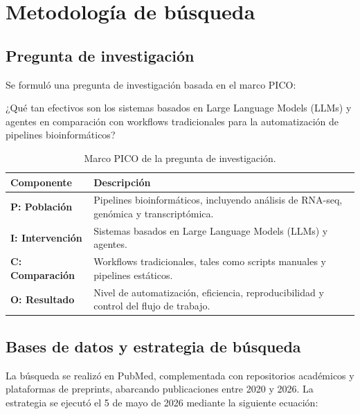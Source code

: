 
\section{Metodología de búsqueda}\label{sec:methods}

\subsection{Pregunta de investigación}

Se formuló una pregunta de investigación basada en el marco PICO:

¿Qué tan efectivos son los sistemas basados en Large Language Models (LLMs) y 
agentes en comparación con workflows tradicionales para la automatización de 
pipelines bioinformáticos?

\begin{table}[htbp]
  \centering
  \caption{Marco PICO de la pregunta de investigación.}\label{tab:pico}
  \begin{tabular}{@{}p{3.2cm} p{9.2cm}@{}}
    \toprule
    \textbf{Componente} & \textbf{Descripción} \\
    \midrule
    \textbf{P: Población}    & Pipelines bioinformáticos, incluyendo análisis de RNA-seq, genómica y transcriptómica. \\
    \textbf{I: Intervención} & Sistemas basados en Large Language Models (LLMs) y agentes. \\
    \textbf{C: Comparación}   & Workflows tradicionales, tales como scripts manuales y pipelines estáticos. \\
    \textbf{O: Resultado}      & Nivel de automatización, eficiencia, reproducibilidad y control del flujo de trabajo. \\
    \bottomrule
  \end{tabular}
\end{table}

\subsection{Bases de datos y estrategia de búsqueda}

La búsqueda se realizó en PubMed, complementada con repositorios académicos 
y plataformas de preprints, abarcando publicaciones entre 2020 y 2026. La 
estrategia se ejecutó el 5 de mayo de 2026 mediante la siguiente ecuación:

